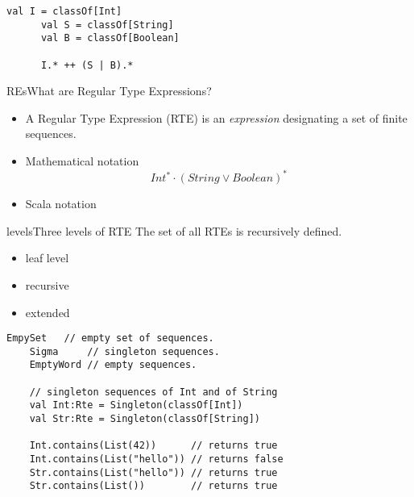 
\newsavebox\exnoteabbbox
\begin{lrbox}{\exnoteabbbox}
  \begin{minipage}{7cm}
    \begin{lstlisting}[style=scalaioScala]
    \end{lstlisting}
  \end{minipage}
\end{lrbox}

\newsavebox\exnotebox
\begin{lrbox}{\exnotebox}
  \begin{minipage}{7cm}
    \begin{lstlisting}[style=scalaioScala]
      val I = classOf[Int]
      val S = classOf[String]
      val B = classOf[Boolean]

      I.* ++ (S | B).*
    \end{lstlisting}
  \end{minipage}
\end{lrbox}


\begin{frame}{REs}{What are Regular Type Expressions?}
  \begin{itemize}
  \item A Regular Type Expression (RTE) is an \emph{expression} designating a set  of finite sequences.
  \item Mathematical notation
    \[Int^* \cdot (String \vee Boolean)^*\]
  \item Scala notation\\
    \usebox\exnotebox
  \end{itemize}
\end{frame}

\begin{frame}{levels}{Three levels of RTE}
  The set of all RTEs is recursively defined.
  \begin{itemize}
  \item leaf level
  \item recursive
  \item extended
  \end{itemize}
\end{frame}

\newsavebox\leafbox
\begin{lrbox}{\leafbox}
  \begin{minipage}{12cm}
    \begin{lstlisting}[style=scalaioScala]
    EmpySet   // empty set of sequences.
    Sigma     // singleton sequences.
    EmptyWord // empty sequences.

    // singleton sequences of Int and of String
    val Int:Rte = Singleton(classOf[Int])    
    val Str:Rte = Singleton(classOf[String])

    Int.contains(List(42))      // returns true
    Int.contains(List("hello")) // returns false
    Str.contains(List("hello")) // returns true
    Str.contains(List())        // returns true
    \end{lstlisting}
  \end{minipage}
\end{lrbox}

